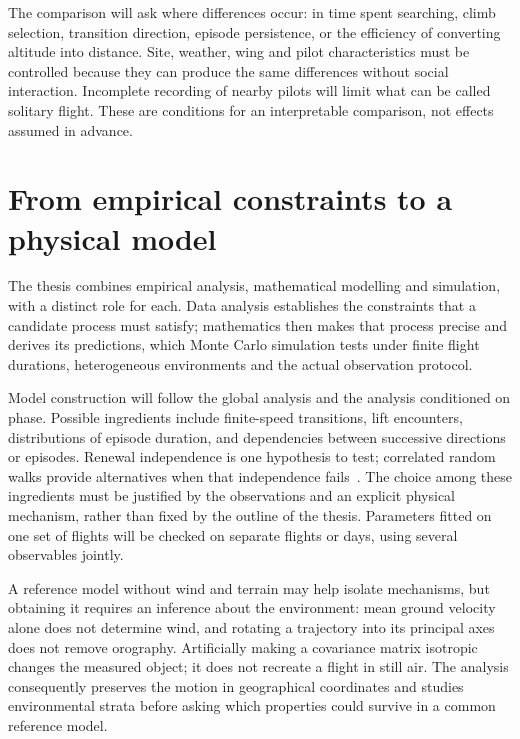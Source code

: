 The comparison will ask where differences occur: in time spent searching, climb selection,
transition direction, episode persistence, or the efficiency of converting altitude into
distance. Site, weather, wing and pilot characteristics must be controlled because they can
produce the same differences without social interaction. Incomplete recording of nearby
pilots will limit what can be called solitary flight. These are conditions for an
interpretable comparison, not effects assumed in advance.

\section{From empirical constraints to a physical model}
\label{sec:intro-method}

The thesis combines empirical analysis, mathematical modelling and simulation, with a
distinct role for each. Data analysis establishes the constraints that a candidate process
must satisfy; mathematics then makes that process precise and derives its predictions,
which Monte Carlo simulation tests under finite flight durations, heterogeneous environments
and the actual observation protocol.

Model construction will follow the global analysis and the analysis conditioned on phase.
Possible ingredients include finite-speed transitions, lift encounters, distributions of
episode duration, and dependencies between successive directions or episodes. Renewal
independence is one hypothesis to test; correlated random walks provide alternatives when
that independence fails~\cite{tejedor2010,schulz2013}. The choice among these ingredients must be justified by the observations and an explicit
physical mechanism, rather than fixed by the outline of the thesis. Parameters fitted on one set of flights will be checked on
separate flights or days, using several observables jointly.

A reference model without wind and terrain may help isolate mechanisms, but obtaining it
requires an inference about the environment: mean ground velocity alone does not determine
wind, and rotating a trajectory into its principal axes does not remove orography. Artificially
making a covariance matrix isotropic changes the measured object; it does not recreate a
flight in still air. The analysis consequently preserves the motion in geographical
coordinates and studies environmental strata before asking which properties could survive
in a common reference model.


